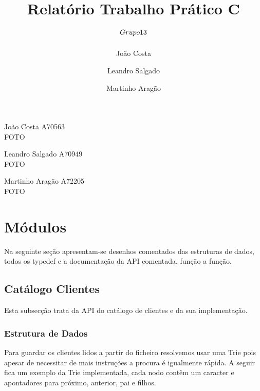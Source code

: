 \documentclass[10pt] {article}
\begin{document}
\title{Relatório Trabalho Prático C \\ $\small{Grupo 13}$}
\author{João Costa \and Leandro Salgado \and Martinho Aragão}

\maketitle


\begin{flushleft}
João Costa A70563 \\
FOTO
\end{flushleft}

\begin{flushleft}
Leandro Salgado A70949 \\
FOTO
\end{flushleft}

\begin{flushleft}
Martinho Aragão A72205 \\
FOTO
\end{flushleft}

\newpage

\tableofcontents

\newpage

\section{Módulos}
Na seguinte seção apresentam-se desenhos comentados das estruturas de dados,
todos os typedef e a documentação da API comentada, função a função.


\subsection{Catálogo Clientes}
\par Esta subsecção trata da API do catálogo de clientes e da sua implementação.

\subsubsection{Estrutura de Dados}
\par
Para guardar os clientes lidos a partir do ficheiro resolvemos usar uma Trie pois apesar de
necessitar de mais instruções a procura é igualmente rápida. A seguir fica um exemplo da Trie implementada, 
cada nodo contêm um caracter e apontadores para próximo, anterior, pai e filhos.
\end{document}

